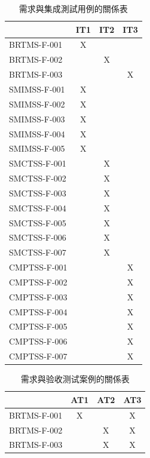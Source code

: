 \begin{enumerate}
\begin{enumerate}
					\begin{table}[htbp]
					\centering
					\caption{需求與集成測試用例的關係表}
					\label{table11}
					\begin{tabular}{|l|c|c|c|}
					\hline
					 & \multicolumn{1}{l|}{IT1} & \multicolumn{1}{l|}{IT2} & \multicolumn{1}{l|}{IT3} \\ \hline
					BRTMS-F-001 & X &  &  \\ \hline
					BRTMS-F-002 &  & X &  \\ \hline
					BRTMS-F-003 &  &  & X \\ \hline
					SMIMSS-F-001 & X &  &  \\ \hline
					SMIMSS-F-002 & X &  &  \\ \hline
					SMIMSS-F-003 & X &  &  \\ \hline
					SMIMSS-F-004 & X &  &  \\ \hline
					SMIMSS-F-005 & X &  &  \\ \hline
					SMCTSS-F-001 &  & X &  \\ \hline
					SMCTSS-F-002 &  & X &  \\ \hline
					SMCTSS-F-003 &  & X &  \\ \hline
					SMCTSS-F-004 &  & X &  \\ \hline
					SMCTSS-F-005 &  & X &  \\ \hline
					SMCTSS-F-006 &  & X &  \\ \hline
					SMCTSS-F-007 &  & X &  \\ \hline
					CMPTSS-F-001 &  &  & X \\ \hline
					CMPTSS-F-002 &  &  & X \\ \hline
					CMPTSS-F-003 & \multicolumn{1}{l|}{} & \multicolumn{1}{l|}{} & X \\ \hline
					CMPTSS-F-004 & \multicolumn{1}{l|}{} & \multicolumn{1}{l|}{} & X \\ \hline
					CMPTSS-F-005 & \multicolumn{1}{l|}{} & \multicolumn{1}{l|}{} & X \\ \hline
					CMPTSS-F-006 & \multicolumn{1}{l|}{} & \multicolumn{1}{l|}{} & X \\ \hline
					CMPTSS-F-007 & \multicolumn{1}{l|}{} & \multicolumn{1}{l|}{} & X \\ \hline
					\end{tabular}
					\end{table}

					\begin{table}[htbp]
					\centering
					\caption{需求與验收测试案例的關係表}
					\label{table12}
					\begin{tabular}{|l|c|c|c|}
					\hline
					 & \multicolumn{1}{l|}{AT1} & \multicolumn{1}{l|}{AT2} & \multicolumn{1}{l|}{AT3} \\ \hline
					BRTMS-F-001 & X &  & X \\ \hline
					BRTMS-F-002 &  & X & X \\ \hline
					BRTMS-F-003 &  & X & X \\ \hline
					\end{tabular}
					\end{table}
				\end{enumerate}
		\end{enumerate}

